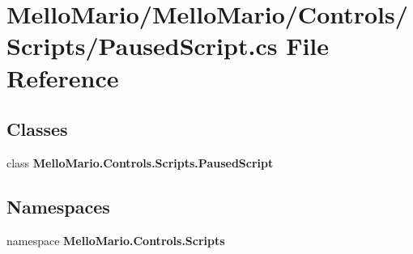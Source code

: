 \section{Mello\+Mario/\+Mello\+Mario/\+Controls/\+Scripts/\+Paused\+Script.cs File Reference}
\label{PausedScript_8cs}
\subsection*{Classes}
\begin{DoxyCompactItemize}
\item 
class \textbf{ Mello\+Mario.\+Controls.\+Scripts.\+Paused\+Script}
\end{DoxyCompactItemize}
\subsection*{Namespaces}
\begin{DoxyCompactItemize}
\item 
namespace \textbf{ Mello\+Mario.\+Controls.\+Scripts}
\end{DoxyCompactItemize}
